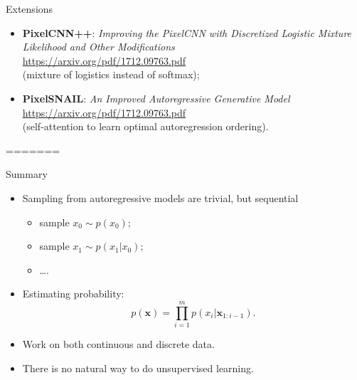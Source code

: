 \documentclass{beamer}
\newcommand{\bx}{\mathbf{x}}
\begin{document}
 \begin{frame}{Extensions}
     \begin{itemize}
         \item \textbf{PixelCNN++}: \textit{Improving the PixelCNN with Discretized Logistic Mixture Likelihood and Other Modifications} \\
         \href{https://arxiv.org/pdf/1701.05517.pdf}{https://arxiv.org/pdf/1712.09763.pdf} \\
         (mixture of logistics instead of softmax);
         \item \textbf{PixelSNAIL}: \textit{An Improved Autoregressive Generative Model} \\
         \href{https://arxiv.org/pdf/1712.09763.pdf}{https://arxiv.org/pdf/1712.09763.pdf} \\
         (self-attention to learn optimal autoregression ordering).
     \end{itemize}
 \end{frame}
=======
\begin{frame}{Summary}
    \begin{itemize}
        \item Sampling from autoregressive models are trivial, but sequential
        \begin{itemize}
            \item sample $x_0 \sim p(x_0)$;
            \item sample $x_1 \sim p(x_1 | x_0)$;
            \item \dots.
        \end{itemize}
        \item Estimating probability:
        \[
            p(\bx) = \prod_{i=1}^m p(x_i | \bx_{1:i - 1}).
        \]
        \item Work on both continuous and discrete data.
        \item There is no natural way to do unsupervised learning.
    \end{itemize}
\end{frame}
\end{document}
